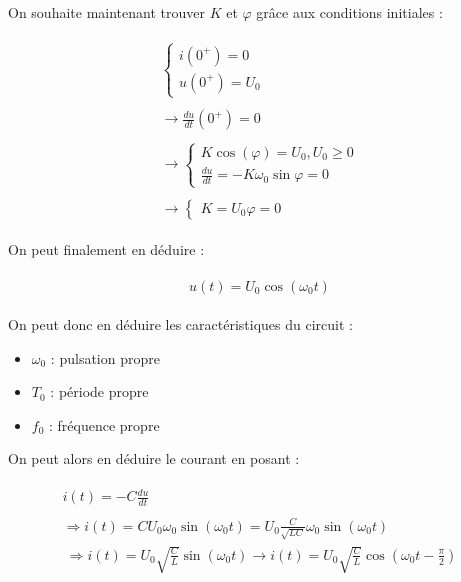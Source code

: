 \documentclass{article}
\begin{document}
On souhaite maintenant trouver $K$ et $\varphi$ grâce aux conditions initiales :

\begin{align*}\begin{split}
\begin{cases}
    i(0^+)=0\\
    u(0^+)=U_0
\end{cases}\\\\
\longrightarrow \frac{du}{dt}(0^+)=0\\\\
\longrightarrow
\begin{cases}
    K\cos(\varphi)=U_0, U_0\ge0\\
    \frac{du}{dt}=-K\omega_0\sin\varphi=0
\end{cases}\\\\
\longrightarrow
\begin{cases}
    K=U_0
    \varphi=0
\end{cases}
\end{split}\end{align*}

On peut finalement en déduire :

\begin{align*}\begin{split}
u(t)=U_0\cos(\omega_0t)
\end{split}\end{align*}

On peut donc en déduire les caractéristiques du circuit :

\begin{itemize}
    \item $\omega_0$ : pulsation propre
    \item $T_0$ : période propre
    \item $f_0$ : fréquence propre
\end{itemize}

On peut alors en déduire le courant en posant :

\begin{align*}\begin{split}
i(t)=-C\frac{du}{dt}\\\\
\Longrightarrow i(t)=CU_0\omega_0\sin(\omega_0 t) = U_0 \frac{C}{\sqrt{LC}}\omega_0\sin(\omega_0t)\\\
\Longrightarrow \boxed{i(t)=U_0\sqrt{\frac{C}{L}}\sin(\omega_0t)}
\longrightarrow \boxed{i(t)=U_0\sqrt{\frac{C}{L}}\cos(\omega_0t-\frac{\pi}{2})}
\end{split}\end{align*}
\end{document}
